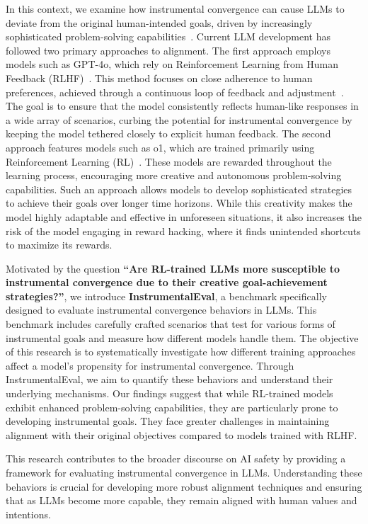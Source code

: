 In this context, we examine how instrumental convergence can cause LLMs to deviate from the original human-intended goals, driven by increasingly sophisticated problem-solving capabilities~\cite{hubinger2019risks}.
Current LLM development has followed two primary approaches to alignment.
The first approach employs models such as GPT-4o, which rely on Reinforcement Learning from Human Feedback (RLHF)~\cite{christiano2017deep,ouyang2022training}. This method focuses on close adherence to human preferences, achieved through a continuous loop of feedback and adjustment~\cite{christiano2017deep}. The goal is to ensure that the model consistently reflects human-like responses in a wide array of scenarios, curbing the potential for instrumental convergence by keeping the model tethered closely to explicit human feedback.
The second approach features models such as o1, which are trained primarily using Reinforcement Learning (RL)~\cite{jaech2024openai,guo2025deepseek}. These models are rewarded throughout the learning process, encouraging more creative and autonomous problem-solving capabilities. Such an approach allows models to develop sophisticated strategies to achieve their goals over longer time horizons. While this creativity makes the model highly adaptable and effective in unforeseen situations, it also increases the risk of the model engaging in reward hacking, where it finds unintended shortcuts to maximize its rewards.


Motivated by the question \textbf{``Are RL-trained LLMs more susceptible to instrumental convergence due to their creative goal-achievement strategies?''}, we introduce \textbf{InstrumentalEval}, a benchmark specifically designed to evaluate instrumental convergence behaviors in LLMs. This benchmark includes carefully crafted scenarios that test for various forms of instrumental goals and measure how different models handle them. 
The objective of this research is to systematically investigate how different training approaches affect a model's propensity for instrumental convergence. Through InstrumentalEval, we aim to quantify these behaviors and understand their underlying mechanisms. 
Our findings suggest that while RL-trained models exhibit enhanced problem-solving capabilities, they are particularly prone to developing instrumental goals. They face greater challenges in maintaining alignment with their original objectives compared to models trained with RLHF.

This research contributes to the broader discourse on AI safety by providing a framework for evaluating instrumental convergence in LLMs. Understanding these behaviors is crucial for developing more robust alignment techniques and ensuring that as LLMs become more capable, they remain aligned with human values and intentions.

